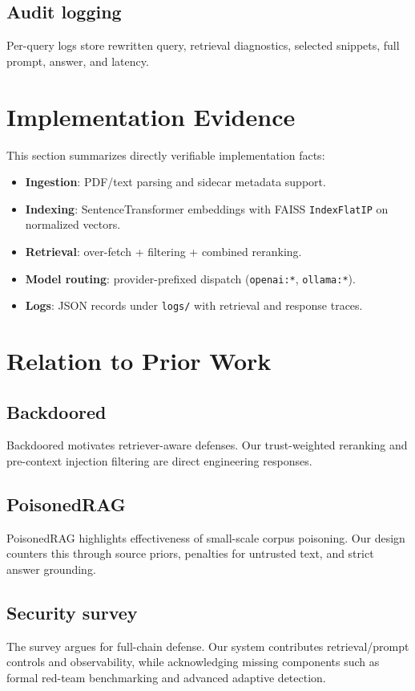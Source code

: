 \documentclass[conference]{IEEEtran}
\begin{document}
\subsection{Audit logging}
Per-query logs store rewritten query, retrieval diagnostics, selected snippets, full prompt, answer, and latency.

\section{Implementation Evidence}
This section summarizes directly verifiable implementation facts:
\begin{itemize}
    \item \textbf{Ingestion}: PDF/text parsing and sidecar metadata support.
    \item \textbf{Indexing}: SentenceTransformer embeddings with FAISS \texttt{IndexFlatIP} on normalized vectors.
    \item \textbf{Retrieval}: over-fetch + filtering + combined reranking.
    \item \textbf{Model routing}: provider-prefixed dispatch (\texttt{openai:*}, \texttt{ollama:*}).
    \item \textbf{Logs}: JSON records under \texttt{logs/} with retrieval and response traces.
\end{itemize}

\section{Relation to Prior Work}
\subsection{Backdoored}
Backdoored motivates retriever-aware defenses. Our trust-weighted reranking and pre-context injection filtering are direct engineering responses.

\subsection{PoisonedRAG}
PoisonedRAG highlights effectiveness of small-scale corpus poisoning. Our design counters this through source priors, penalties for untrusted text, and strict answer grounding.

\subsection{Security survey}
The survey argues for full-chain defense. Our system contributes retrieval/prompt controls and observability, while acknowledging missing components such as formal red-team benchmarking and advanced adaptive detection.
\end{document}
